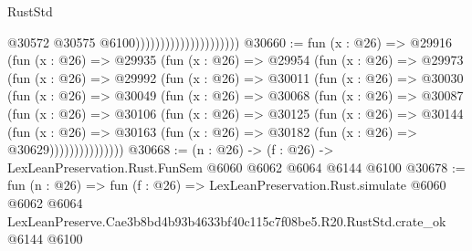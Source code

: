 \begin{lexlean}{RustStd}
\begin{coremodule}
                                              @30572
                                              @30575
                                              @6100)))))))))))))))))))))
@30660 := fun (x : @26) =>
  @29916
    (fun (x : @26) =>
    @29935
      (fun (x : @26) =>
      @29954
        (fun (x : @26) =>
        @29973
          (fun (x : @26) =>
          @29992
            (fun (x : @26) =>
            @30011
              (fun (x : @26) =>
              @30030
                (fun (x : @26) =>
                @30049
                  (fun (x : @26) =>
                  @30068
                    (fun (x : @26) =>
                    @30087
                      (fun (x : @26) =>
                      @30106
                        (fun (x : @26) =>
                        @30125
                          (fun (x : @26) =>
                          @30144
                            (fun (x : @26) =>
                            @30163 (fun (x : @26) => @30182 (fun (x : @26) => @30629)))))))))))))))
@30668 := (n : @26) -> (f : @26) -> LexLeanPreservation.Rust.FunSem @6060 @6062 @6064 @6144 @6100
@30678 := fun (n : @26) =>
  fun (f : @26) =>
  LexLeanPreservation.Rust.simulate
    @6060
    @6062
    @6064
    LexLeanPreserve.Cae3b8bd4b93b4633bf40c115c7f08be5.R20.RustStd.crate_ok
    @6144
    @6100
\end{coremodule}
\end{lexlean}
